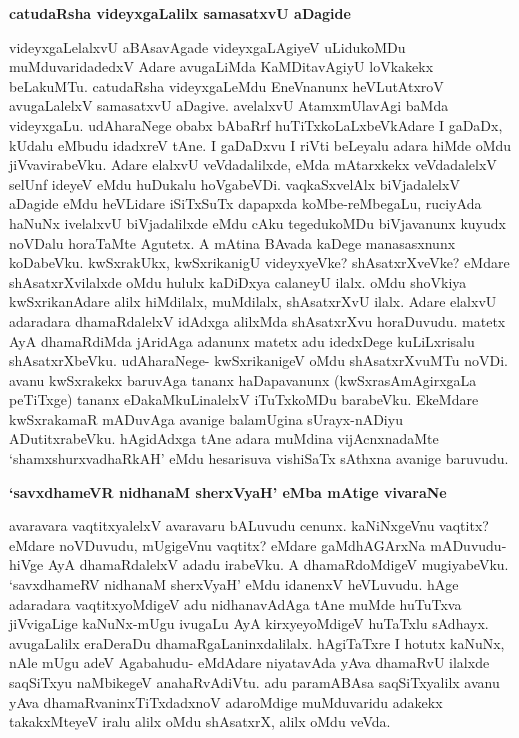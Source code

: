 {\bigskip
\noindent
{\large\bf catudaRsha videyxgaLalilx samasatxvU aDagide}}\label{page197}
\medskip

\noindent
videyxgaLelalxvU aBAsavAgade videyxgaLAgiyeV uLidukoMDu muMduvari\-dadedxV Adare avugaLiMda KaMDitavAgiyU loVkakekx beLakuMTu. catudaRsha videyxgaLeMdu EneVnanunx heVLutAtxroV avugaLalelxV samasatxvU aDagive. avelalxvU AtamxmUlavAgi baMda videyxgaLu. udAharaNege obabx bAbaRrf huTiTxkoLaLx\-beVkAdare I gaDaDx, kUdalu eMbudu idadxreV tAne. I gaDaDxvu I riVti beLeyalu adara hiMde oMdu jiVvavirabeVku. Adare elalxvU veVdadalilxde, eMda mAtarxkekx veVdadalelxV selUnf ideyeV eMdu huDukalu hoVgabeVDi. vaqkaSxvelAlx biVjadalelxV aDagide eMdu heVLidare iSiTxSuTx dapapxda koMbe-reMbe\-gaLu, ruciyAda haNuNx ivelalxvU biVjadalilxde eMdu cAku tegedukoMDu biVjavanunx kuyudx noVDalu horaTaMte Agutetx. A mAtina BAvada kaDege manasasxnunx koDabeVku. kwSxrakUkx, kwSxrikanigU videyxyeVke? shAsatxrXveVke? eMdare shAsatxrXvilalxde oMdu hululx kaDiDxya calaneyU ilalx. oMdu shoVkiya kwSxrikanAdare alilx hiMdilalx, muMdilalx, shAsatxrXvU ilalx. Adare elalxvU adaradara dhamaRdalelxV idAdxga alilxMda shAsatxrXvu horaDuvudu. matetx AyA dhamaRdiMda jAridAga adanunx matetx adu idedxDege kuLiLxrisalu shAsatxrXbeVku. udAharaNege- kwSxrikanigeV oMdu shAsatxrXvuMTu noVDi. avanu kwSxrakekx baruvAga tananx haDapavanunx (kwSxrasAmAgirxgaLa peTiTxge) tananx eDakaMkuLinalelxV iTuTxkoMDu barabeVku. EkeMdare kwSxrakamaR mADu\-vAga avanige balamUgina sUrayx-nADiyu ADutitxrabeVku. hAgidAdxga tAne adara muMdina vijAcnxna\-daMte `shamxshurxvadhaRkAH' eMdu hesarisuva vishiSaTx sAthxna avanige baruvudu.

{\bigskip
\noindent
{\large\bf `savxdhameVR nidhanaM sherxVyaH' eMba mAtige vivaraNe}}\label{197}
\medskip

\noindent
avaravara vaqtitxyalelxV avaravaru bALuvudu cenunx. kaNiNxgeVnu vaqtitx? eMdare noVDuvudu, mUgi\-geVnu vaqtitx? eMdare gaMdhAGArxNa mADuvudu- hiVge AyA dhamaRdalelxV adadu irabeVku. A dhamaR\-doMdigeV mugiyabeVku. `savxdhameRV nidhanaM sherxVyaH' eMdu idanenxV heVLuvudu. hAge adaradara vaqtitxyoMdigeV adu nidhanavAdAga tAne muMde huTuTxva jiVvigaLige kaNuNx-mUgu ivugaLu AyA kirxyeyoMdigeV huTaTxlu sAdhayx. avugaLalilx eraDeraDu dhamaRgaLaninxdalilalx. hAgiTaTxre I hotutx kaNuNx, nAle mUgu adeV Agabahudu- eMdAdare niyata\break\-vAda yAva dhamaRvU ilalxde saqSiTxyu naMbikegeV anahaRvAdiVtu. adu paramA\-BAsa saqSiTxyalilx avanu yAva dhamaRvaninxTiTxdadxnoV adaroMdige muMduvaridu adakekx takakxMteyeV iralu alilx oMdu shAsatxrX, alilx oMdu veVda.

